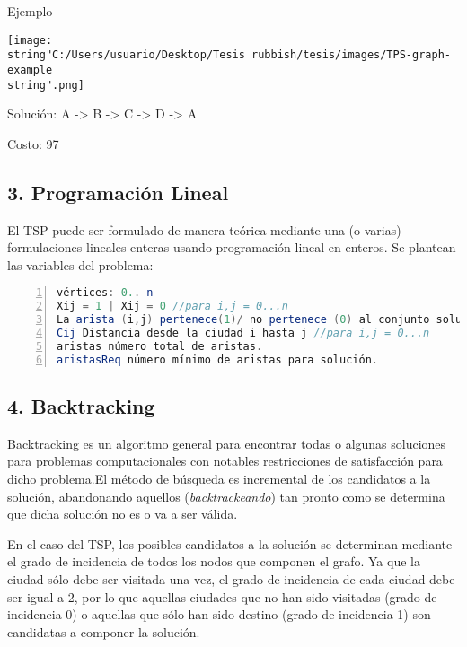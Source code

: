 Ejemplo

\texttt{[image: \\string"C:/Users/usuario/Desktop/Tesis rubbish/tesis/images/TPS-graph-example\\string".png]}

Solución: A -> B -> C -> D -> A 

Costo: 97


\subsection*{3. Programación Lineal}

El \ac{TSP} puede ser formulado de manera teórica mediante una (o
varias) formulaciones lineales enteras usando programación lineal
en enteros. Se plantean las variables del problema: 

\begin{lstlisting}[basicstyle={\footnotesize},breaklines=true,language=Java,captionpos=t,tabsize=3,frame=no,keywordstyle={\color{blue}},commentstyle={\color{gray}},stringstyle={\color{red}},numbers=left,numberstyle={\tiny},numbersep=5pt,breaklines=true,showstringspaces=false,basicstyle={\footnotesize},emph={label}]
vértices: 0.. n 	
Xij = 1 | Xij = 0 //para i,j = 0...n
La arista (i,j) pertenece(1)/ no pertenece (0) al conjunto solución.
Cij Distancia desde la ciudad i hasta j //para i,j = 0...n	 
aristas número total de aristas. 	
aristasReq número mínimo de aristas para solución. 
\end{lstlisting}



\subsection*{4. Backtracking}

Backtracking es un algoritmo general para encontrar todas o algunas
soluciones para problemas computacionales con notables restricciones
de satisfacción para dicho problema.El método de búsqueda es incremental
de los candidatos a la solución, abandonando aquellos (\emph{backtrackeando})
tan pronto como se determina que dicha solución no es o va a ser válida. 

En el caso del \ac{TSP}, los posibles candidatos a la solución se
determinan mediante el grado de incidencia de todos los nodos que
componen el grafo. Ya que la ciudad sólo debe ser visitada una vez,
el grado de incidencia de cada ciudad debe ser igual a 2, por lo que
aquellas ciudades que no han sido visitadas (grado de incidencia 0)
o aquellas que sólo han sido destino (grado de incidencia 1) son candidatas
a componer la solución.


